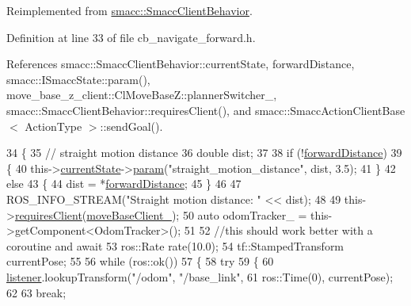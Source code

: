 Reimplemented from \hyperlink{classsmacc_1_1SmaccClientBehavior_a7962382f93987c720ad432fef55b123f}{smacc\+::\+Smacc\+Client\+Behavior}.



Definition at line 33 of file cb\+\_\+navigate\+\_\+forward.\+h.



References smacc\+::\+Smacc\+Client\+Behavior\+::current\+State, forward\+Distance, smacc\+::\+I\+Smacc\+State\+::param(), move\+\_\+base\+\_\+z\+\_\+client\+::\+Cl\+Move\+Base\+Z\+::planner\+Switcher\+\_\+, smacc\+::\+Smacc\+Client\+Behavior\+::requires\+Client(), and smacc\+::\+Smacc\+Action\+Client\+Base$<$ Action\+Type $>$\+::send\+Goal().


\begin{DoxyCode}
34     \{
35         \textcolor{comment}{// straight motion distance}
36         \textcolor{keywordtype}{double} dist;
37 
38         \textcolor{keywordflow}{if} (!\hyperlink{classmove__base__z__client_1_1CbNavigateForward_ab3097d686b5a82b4f650bc5175d8ab73}{forwardDistance})
39         \{
40             this->\hyperlink{classsmacc_1_1SmaccClientBehavior_af76fc9b877542ed5caf033f820c107d0}{currentState}->\hyperlink{classsmacc_1_1ISmaccState_a4982f2187ed6da337462721146e8ef70}{param}(\textcolor{stringliteral}{"straight\_motion\_distance"}, dist, 3.5);
41         \}
42         \textcolor{keywordflow}{else}
43         \{
44             dist = *\hyperlink{classmove__base__z__client_1_1CbNavigateForward_ab3097d686b5a82b4f650bc5175d8ab73}{forwardDistance};
45         \}
46 
47         ROS\_INFO\_STREAM(\textcolor{stringliteral}{"Straight motion distance: "} << dist);
48 
49         this->\hyperlink{classsmacc_1_1SmaccClientBehavior_a917f001e763a1059af337bf4e164f542}{requiresClient}(\hyperlink{classmove__base__z__client_1_1CbNavigateForward_a20ebd5e221af450360477380995c2933}{moveBaseClient\_});
50         \textcolor{keyword}{auto} odomTracker\_ = this->getComponent<OdomTracker>();
51 
52         \textcolor{comment}{//this should work better with a coroutine and await}
53         ros::Rate rate(10.0);
54         tf::StampedTransform currentPose;
55 
56         \textcolor{keywordflow}{while} (ros::ok())
57         \{
58             \textcolor{keywordflow}{try}
59             \{
60                 \hyperlink{classmove__base__z__client_1_1CbNavigateForward_afa40fd805d66eb09e9b4b1bd8356b2a5}{listener}.lookupTransform(\textcolor{stringliteral}{"/odom"}, \textcolor{stringliteral}{"/base\_link"},
61                                          ros::Time(0), currentPose);
62 
63                 \textcolor{keywordflow}{break};

\end{DoxyCode}
